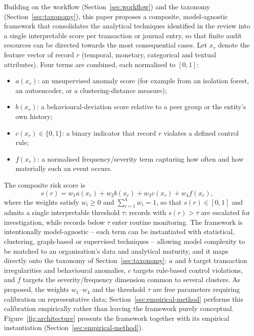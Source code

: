 \documentclass[preprint,12pt]{elsarticle}
\begin{document}
Building on the workflow (Section~\ref{sec:workflow}) and the taxonomy (Section~\ref{sec:taxonomy}), this paper proposes a composite, model-agnostic framework that consolidates the analytical techniques identified in the review into a single interpretable score per transaction or journal entry, so that finite audit resources can be directed towards the most consequential cases. Let $x_r$ denote the feature vector of record $r$ (temporal, monetary, categorical and textual attributes). Four terms are combined, each normalised to $[0,1]$:
\begin{itemize}
    \item $a(x_r)$: an unsupervised anomaly score (for example from an isolation forest, an autoencoder, or a clustering-distance measure);
    \item $b(x_r)$: a behavioural-deviation score relative to a peer group or the entity's own history;
    \item $c(x_r)\in\{0,1\}$: a binary indicator that record $r$ violates a defined control rule;
    \item $f(x_r)$: a normalised frequency/severity term capturing how often and how materially such an event occurs.
\end{itemize}
The composite risk score is
\begin{equation}
s(r)=w_1 a(x_r)+w_2 b(x_r)+w_3 c(x_r)+w_4 f(x_r),
\label{eq:risk}
\end{equation}
where the weights satisfy $w_i \ge 0$ and $\sum_{i=1}^{4} w_i = 1$, so that $s(r)\in[0,1]$ and admits a single interpretable threshold $\tau$: records with $s(r) > \tau$ are escalated for investigation, while records below $\tau$ enter routine monitoring. The framework is intentionally model-agnostic -- each term can be instantiated with statistical, clustering, graph-based or supervised techniques -- allowing model complexity to be matched to an organisation's data and analytical maturity, and it maps directly onto the taxonomy of Section~\ref{sec:taxonomy}: $a$ and $b$ target transaction irregularities and behavioural anomalies, $c$ targets rule-based control violations, and $f$ targets the severity/frequency dimension common to several clusters. As proposed, the weights $w_1$--$w_4$ and the threshold $\tau$ are free parameters requiring calibration on representative data; Section~\ref{sec:empirical-method} performs this calibration empirically rather than leaving the framework purely conceptual. Figure~\ref{fig:architecture} presents the framework together with its empirical instantiation (Section~\ref{sec:empirical-method}).
\end{document}
